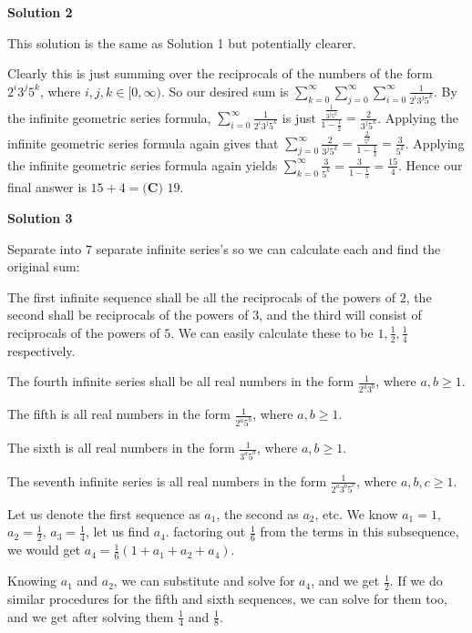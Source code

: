 \begin{enumerate}
\textbf{Solution 2}

This solution is the same as Solution 1 but potentially clearer.

 Clearly this is just summing over the reciprocals of the numbers of the form $2^i3^j5^k$, where $i,j,k\in [0,\infty)$. So our desired sum is $\sum_{k=0}^{\infty}\sum_{j=0}^{\infty}\sum_{i=0}^{\infty}\frac{1}{2^i3^j5^k}$. By the infinite geometric series formula, $\sum_{i=0}^{\infty}\frac{1}{2^i3^j5^k}$ is just $\frac{\frac{1}{3^j5^k}}{1-\frac{1}{2}}=\frac{2}{3^j5^k}$. Applying the infinite geometric series formula again gives that $\sum_{j=0}^{\infty}\frac{2}{3^j5^k}=\frac{\frac{2}{5^k}}{1-\frac{1}{3}}=\frac{3}{5^k}$. Applying the infinite geometric series formula again yields $\sum_{k=0}^{\infty}\frac{3}{5^k}=\frac{3}{1-\frac{1}{5}}=\frac{15}{4}$. Hence our final answer is $15+4=\boxed{\textbf{(C) } 19}$.

 



\textbf{Solution 3}

Separate into $7$ separate infinite series's so we can calculate each and find the original sum: 

 The first infinite sequence shall be all the reciprocals of the powers of $2$, the second shall be reciprocals of the powers of $3$, and the third will consist of reciprocals of the powers of $5$. We can easily calculate these to be $1, \frac{1}{2}, \frac{1}{4}$ respectively. 

 The fourth infinite series shall be all real numbers in the form $\frac{1}{2^a3^b}$, where $a,b\geq1$.

 The fifth is all real numbers in the form $\frac{1}{2^a5^b}$, where $a,b\geq1$. 

 The sixth is all real numbers in the form $\frac{1}{3^a5^b}$, where $a,b\geq1$. 

 The seventh infinite series is all real numbers in the form $\frac{1}{2^a3^b5^c}$, where $a,b,c\geq1$. 

 Let us denote the first sequence as $a_{1}$, the second as $a_{2}$, etc. We know $a_{1}=1$, $a_{2}=\frac{1}{2}$, $a_{3}=\frac{1}{4}$, let us find $a_{4}$. factoring out $\frac{1}{6}$ from the terms in this subsequence, we would get $a_{4}=\frac{1}{6}(1+a_{1}+a_{2}+a_{4})$. 

 Knowing $a_{1}$ and $a_{2}$, we can substitute and solve for $a_{4}$, and we get $\frac{1}{2}$. If we do similar procedures for the fifth and sixth sequences, we can solve for them too, and we get after solving them $\frac{1}{4}$ and $\frac{1}{8}$. 


\end{enumerate}
